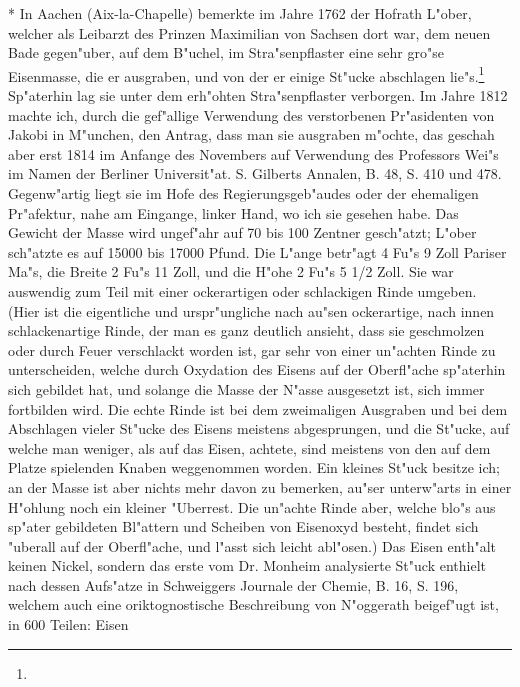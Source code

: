 \documentclass[a4paper, 11pt, oneside, polutonikogreek, german]{article}
\begin{document}
* In Aachen (Aix-la-Chapelle) bemerkte im Jahre 1762 der Hofrath L"ober, welcher als Leibarzt des Prinzen Maximilian von Sachsen dort war, dem neuen Bade gegen"uber, auf dem B"uchel, im Stra"senpflaster eine sehr gro"se Eisenmasse, die er ausgraben, und von der er einige St"ucke abschlagen lie"s.\footnote{} Sp"aterhin lag sie unter dem erh"ohten Stra"senpflaster verborgen. Im Jahre 1812 machte ich, durch die gef"allige Verwendung des verstorbenen Pr"asidenten von Jakobi in M"unchen, den Antrag, dass man sie ausgraben m"ochte, das geschah aber erst 1814 im Anfange des Novembers auf Verwendung des Professors Wei"s im Namen der Berliner Universit"at. S. Gilberts Annalen, B. 48, S. 410 und 478. Gegenw"artig liegt sie im Hofe des Regierungsgeb"audes oder der ehemaligen Pr"afektur, nahe am Eingange, linker Hand, wo ich sie gesehen habe. Das Gewicht der Masse wird ungef"ahr auf 70 bis 100 Zentner gesch"atzt; L"ober sch"atzte es auf 15000 bis 17000 Pfund. Die L"ange betr"agt 4 Fu"s 9 Zoll Pariser Ma"s, die Breite 2 Fu"s 11 Zoll, und die H"ohe 2 Fu"s 5 1/2 Zoll. Sie war auswendig zum Teil mit einer ockerartigen oder schlackigen Rinde umgeben. (Hier ist die eigentliche und urspr"ungliche nach au"sen ockerartige, nach innen schlackenartige Rinde, der man es ganz deutlich ansieht, dass sie geschmolzen oder durch Feuer verschlackt worden ist, gar sehr von einer un"achten Rinde zu unterscheiden, welche durch Oxydation des Eisens auf der Oberfl"ache sp"aterhin sich gebildet hat, und solange die Masse der N"asse ausgesetzt ist, sich immer fortbilden wird. Die echte Rinde ist bei dem zweimaligen Ausgraben und bei dem Abschlagen vieler St"ucke des Eisens meistens abgesprungen, und die St"ucke, auf welche man weniger, als auf das Eisen, achtete, sind meistens von den auf dem Platze spielenden Knaben weggenommen worden. Ein kleines St"uck besitze ich; an der Masse ist aber nichts mehr davon zu bemerken, au"ser unterw"arts in einer H"ohlung noch ein kleiner "Uberrest. Die un"achte Rinde aber, welche blo"s aus sp"ater gebildeten Bl"attern und Scheiben von Eisenoxyd besteht, findet sich "uberall auf der Oberfl"ache, und l"asst sich leicht abl"osen.) Das Eisen enth"alt keinen Nickel, sondern das erste vom Dr. Monheim analysierte St"uck enthielt nach dessen Aufs"atze in Schweiggers Journale der Chemie, B. 16, S. 196, welchem auch eine oriktognostische Beschreibung von N"oggerath beigef"ugt ist, in 600 Teilen: Eisen 
\end{document}
